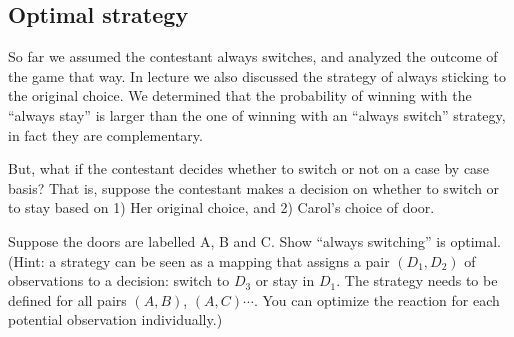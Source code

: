 \documentclass[12pt]{article}
\begin{document}
\newpage
\subsection{Optimal strategy}
So far we assumed the contestant always switches, and analyzed the outcome of the game that way. In lecture we also discussed the strategy of always sticking to the original choice. We determined that the probability of winning with the ``always stay'' is larger than the one of winning with an  ``always switch'' strategy, in fact they are complementary.

But, what if the contestant decides whether to switch or not on a case by case basis? That is, suppose the contestant makes a decision on whether to switch or to stay based on 1) Her original choice, and 2) Carol's choice of door.

 Suppose the doors are labelled A, B and C. Show ``always switching'' is optimal. (Hint: a strategy can be seen as a mapping that assigns a pair $\left(D_1, D_2 \right)$ of observations to a decision: switch to $D_3$ or stay in $D_1$. The strategy needs to be defined for all pairs $\left(A,B\right)$, $\left(A, C\right)\cdots$. You can optimize the reaction for each potential observation individually.)
\end{document}
